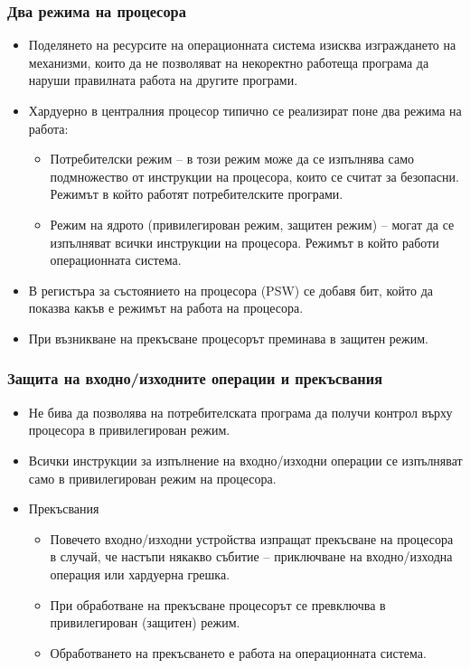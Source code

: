 \documentclass[ignorenonframetext, hyperref=unicode]{beamer}
\begin{document}
\begin{frame}
\frametitle{Два режима на процесора}
\begin{itemize}
  \item Поделянето на ресурсите на операционната система изисква изграждането на
  механизми,
  които да не позволяват на некоректно работеща програма да наруши правилната
  работа на другите програми.
  \item Хардуерно в централния процесор типично се реализират поне  два режима на
  работа:
  \begin{itemize}
    \item Потребителски режим -- в този режим може да се изпълнява само
    подмножество от инструкции на процесора, които се считат за безопасни. 
    Режимът в който работят потребителските програми.
    \item Режим на ядрото (привилегирован режим, защитен режим) -- могат да се
    изпълняват всички инструкции на процесора. Режимът в който работи
    операционната система.
  \end{itemize}
  \item В регистъра за състоянието на процесора (PSW) се добавя бит, който да
  показва какъв е режимът на работа на процесора.
  \item При възникване на прекъсване процесорът преминава в защитен режим.

\end{itemize}

\end{frame}


\begin{frame}
\frametitle{Защита на входно/изходните операции и прекъсвания}
\begin{itemize}
\item Не бива да позволява на потребителската програма да получи контрол
върху процесора в привилегирован режим.
\item Всички инструкции за изпълнение на входно/изходни операции се
изпълняват само в привилегирован режим на процесора.

\item Прекъсвания
\begin{itemize}
    \item Повечето входно/изходни устройства изпращат прекъсване на процесора в
    случай, че настъпи някакво събитие -- приключване на входно/изходна операция
    или хардуерна грешка.
    \item При обработване на прекъсване процесорът се превключва в
    привилегирован (защитен) режим.
    \item Обработването на прекъсването е работа на операционната система.
\end{itemize}
\end{itemize}
\end{frame}
\end{document}
